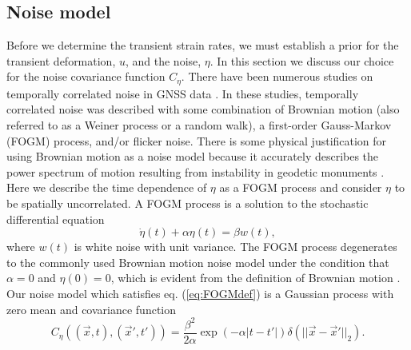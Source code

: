 \documentclass[10pt,letter]{article}
\begin{document}
\subsection{Noise model}\label{sec:NoiseModel}
Before we determine the transient strain rates, we must establish a prior for the transient deformation, $u$, and the noise, $\eta$. In this section we discuss our choice for the noise covariance function $C_\eta$. There have been numerous studies on temporally correlated noise in GNSS data \citep[e.g.,][]{Zhang1997,Mao1999,Williams2004,Langbein2008}. In these studies, temporally correlated noise was described with some combination of Brownian motion (also referred to as a Weiner process or a random walk), a first-order Gauss-Markov (FOGM) process, and/or flicker noise. There is some physical justification for using Brownian motion as a noise model because it accurately describes the power spectrum of motion resulting from instability in geodetic monuments \citep[e.g.,][]{Wyatt1982,Wyatt1989,Langbein1997}. Here we describe the time dependence of $\eta$ as a FOGM process and consider $\eta$ to be spatially uncorrelated. A FOGM process is a solution to the stochastic differential equation
\begin{equation}\label{eq:FOGMdef}
\dot{\eta}(t) + \alpha \eta(t) = \beta w(t),
\end{equation}
where $w(t)$ is white noise with unit variance. The FOGM process degenerates to the commonly used Brownian motion noise model under the condition that $\alpha=0$ and $\eta(0) = 0$, which is evident from the definition of Brownian motion \citep[e.g.,][]{Papoulis1991}. Our noise model which satisfies eq. (\ref{eq:FOGMdef}) is a Gaussian process with zero mean and covariance function
\begin{equation}\label{eq:FOGM}
C_\eta\left((\vec{x},t),(\vec{x}',t')\right) = \frac{\beta^2}{2\alpha}\exp\left(-\alpha|t - t'|\right) \delta(||\vec{x} - \vec{x}'||_2). 
\end{equation}
\end{document}
